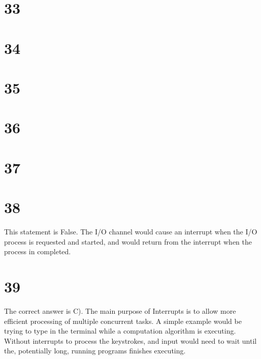\documentclass[a4paper,11pt]{article}
\begin{document}

\section*{33}


\section*{34}


\section*{35}


\section*{36}


\section*{37}


\section*{38}
This statement is False.  The I/O channel would cause an interrupt when the I/O process is requested and started, and would return from the interrupt when the process in completed.


\section*{39}
The correct answer is C).   The main purpose of Interrupts is to allow more efficient processing of multiple concurrent tasks.  A simple example would be trying to type in the terminal while a computation algorithm is executing.  Without interrupts to process the keystrokes, and input would need to wait until the, potentially long, running programs finishes executing. 
\end{document}
